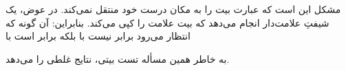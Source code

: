 \section{}
\paragraph{}\label{answer:19}
مشکل این است که عبارت  بیت را به مکان درست خود منتقل نمی‌کند. در عوض، یک شیفتِ علامت‌دار انجام می‌دهد که بیت علامت را کپی می‌کند. بنابراین:
 آن گونه که انتظار می‌رود برابر نیست با  بلکه برابر است با 

به خاطر همین مسأله تست بیتی، نتایج غلطی را می‌دهد.